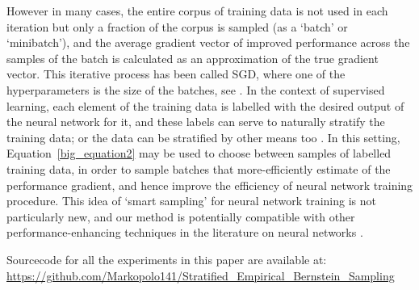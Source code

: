 However in many cases, the entire corpus of training data is not used in each iteration but only a fraction of the corpus is sampled (as a `batch' or `minibatch'), and the average gradient vector of improved performance across the samples of the batch is calculated as an approximation of the true gradient vector. 
This iterative process has been called SGD, where one of the hyperparameters is the size of the batches, see \cite{DBLP:journals/corr/KeskarMNST16,l.2018dont}.
In the context of supervised learning, each element of the training data is labelled with the desired output of the neural network for it, and these labels can serve to naturally stratify the training data; or the data can be stratified by other means too \citep{DBLP:journals/corr/ZhangKM17,DBLP:journals/corr/abs-1804-02772,2014arXiv1405.3080Z}.
In this setting, Equation~\ref{big_equation2} may be used to choose between samples of labelled training data, in order to sample batches that more-efficiently estimate of the performance gradient, and hence improve the efficiency of neural network training procedure.
This idea of `smart sampling' for neural network training is not particularly new, and our method is potentially compatible with other performance-enhancing techniques in the literature on neural networks \citep{10.1007/978-3-319-24486-0_21,article123123131}.

Sourcecode for all the experiments in this paper are available at:\\ \href{https://github.com/Markopolo141/Stratified\_Empirical\_Bernstein\_Sampling}{https://github.com/Markopolo141/Stratified\_Empirical\_Bernstein\_Sampling
}

